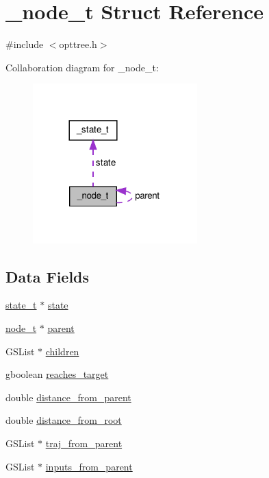 \hypertarget{a00003}{\section{\-\_\-node\-\_\-t \-Struct \-Reference}
\label{d1/d7c/a00003}
}


{\ttfamily \#include $<$opttree.\-h$>$}



\-Collaboration diagram for \-\_\-node\-\_\-t\-:
\nopagebreak
\begin{figure}[H]
\begin{center}
\leavevmode
\includegraphics[width=180pt]{d4/d8c/a00035}
\end{center}
\end{figure}
\subsection*{\-Data \-Fields}
\begin{DoxyCompactItemize}
\item 
\hyperlink{a00018_a1c9d0bb39483d4981491e6383b0dbb47_a1c9d0bb39483d4981491e6383b0dbb47}{state\-\_\-t} $\ast$ \hyperlink{a00003_ad180be797ec209ed2712c000b4fd536f_ad180be797ec209ed2712c000b4fd536f}{state}
\item 
\hyperlink{a00020_a9c3f304c1ae0687240efd69b7dc98cd6_a9c3f304c1ae0687240efd69b7dc98cd6}{node\-\_\-t} $\ast$ \hyperlink{a00003_a3d511232fc93632bb149b5932f215a4f_a3d511232fc93632bb149b5932f215a4f}{parent}
\item 
\-G\-S\-List $\ast$ \hyperlink{a00003_a079f3e21ccc72b5e64c1e75be0a9d527_a079f3e21ccc72b5e64c1e75be0a9d527}{children}
\item 
gboolean \hyperlink{a00003_a777bee52ae854bd4b84bddfc8ab97ede_a777bee52ae854bd4b84bddfc8ab97ede}{reaches\-\_\-target}
\item 
double \hyperlink{a00003_a43d03ac887471ca47aaa3e1a99737821_a43d03ac887471ca47aaa3e1a99737821}{distance\-\_\-from\-\_\-parent}
\item 
double \hyperlink{a00003_a8a0362089c7c238279211ee1d3d18f64_a8a0362089c7c238279211ee1d3d18f64}{distance\-\_\-from\-\_\-root}
\item 
\-G\-S\-List $\ast$ \hyperlink{a00003_a5e2ba085667b237c00e4c754c829e9e9_a5e2ba085667b237c00e4c754c829e9e9}{traj\-\_\-from\-\_\-parent}
\item 
\-G\-S\-List $\ast$ \hyperlink{a00003_a3105712d067868a810af6719f032306d_a3105712d067868a810af6719f032306d}{inputs\-\_\-from\-\_\-parent}
\end{DoxyCompactItemize}


